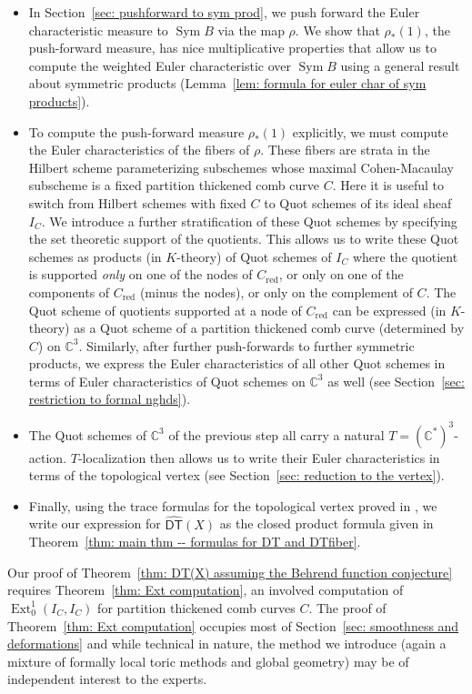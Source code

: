 \documentclass[12pt]{amsart}
\theoremstyle{definition}
\newcommand{\CC} {\mathbb{C}}          %
\newcommand{\Ext}{\operatorname{Ext}}
\newcommand{\Sym}{\operatorname{Sym}}
\newcommand{\DT}{\mathsf{DT}}
\newcommand{\DThat}{\widehat{\DT}}
\newcommand{\red}{\mathrm{red}}
\begin{document}
\begin{itemize}
\item In Section~\ref{sec: pushforward to sym prod}, we push forward
the Euler characteristic measure to $\Sym B$ via the map $\rho$. We
show that $\rho_{*}(1)$, the push-forward measure, has nice
multiplicative properties that allow us to compute the weighted
Euler characteristic over $\Sym B$ using a general result about
symmetric products (Lemma~\ref{lem: formula for euler char of sym
products}). 
\item To compute the push-forward measure $\rho_{*}(1)$ explicitly, we
must compute the Euler characteristics of the fibers of $\rho$. These
fibers are strata in the Hilbert scheme parameterizing subschemes
whose maximal Cohen-Macaulay subscheme is a fixed partition thickened
comb curve $C$. 
Here it is useful to switch from Hilbert schemes with fixed $C$ 
to Quot schemes of its ideal sheaf $I_C$. We 
introduce a further stratification of these Quot schemes by specifying the 
set theoretic support of the quotients. This allows us to write these Quot 
schemes as products (in $K$-theory) of Quot schemes 
of $I_C$ where the quotient is supported \emph{only} on one of the nodes of $C_{\red}$, 
or only on one of the components of $C_{\red}$ (minus the nodes), or only on the 
complement of $C$. The Quot scheme of quotients supported at a node of 
$C_{\red}$ can be expressed (in $K$-theory) as a Quot scheme of a partition 
thickened comb curve (determined by $C$) on $\CC^3$. Similarly, after further 
push-forwards to further symmetric products, we express the Euler characteristics 
of all other Quot schemes in terms of Euler characteristics of Quot 
schemes on $\CC^3$ as well (see Section~\ref{sec: restriction to formal nghds}). 
\item The Quot schemes of $\CC^3$ of the previous step all carry a natural $T=\left(\CC^{*}
\right)^{3}$-action. $T$-localization then allows us to write their
Euler characteristics in terms of the topological vertex (see
Section~\ref{sec: reduction to the vertex}). 
\item Finally, using the trace formulas for the topological vertex
proved in \cite{Bryan-Kool-Young}, we write our expression for
$\DThat (X)$ as the closed product formula given in Theorem~\ref{thm:
main thm -- formulas for DT and DTfiber}. 
\end{itemize}

Our proof of Theorem~\ref{thm: DT(X) assuming the Behrend
function conjecture} requires Theorem~\ref{thm: Ext computation}, an
involved computation of $\Ext^{1}_{0}(I_{C},I_{C})$ for partition
thickened comb curves $C$. The proof of Theorem~\ref{thm: Ext
computation} occupies most of Section~\ref{sec: smoothness and
deformations} and while technical in nature, the method we introduce
(again a mixture of formally local toric methods and global geometry)
may be of independent interest to the experts.
\end{document}
